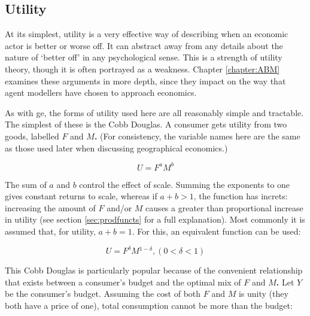 \subsection{Utility \label{sec:utilityintro}}

At its simplest, utility is a very effective way of describing when an economic actor is better or worse off. It can abstract away from any details about the nature of `better off' in any psychological sense. This is a strength of utility theory, though it is often portrayed as a weakness. Chapter \ref{chapter:ABM} examines these arguments in more depth, since they impact on the way that agent modellers have chosen to approach economics. 

As with \gls{ge}, the forms of utility used here are all reasonably simple and tractable. The simplest of these is the Cobb Douglas. A consumer gets utility from two goods, labelled $F$ and \textbf{$M$.} (For consistency, the variable names here are the same as those used later when discussing geographical economics.)

\begin{equation}
U=F^{a}M^{b}\label{eq:-1}
\end{equation}

The sum of $a$ and \textbf{$b$} control the effect of scale. Summing the exponents to one gives constant returns to scale, whereas if $a+b>1$, the function has \gls{increts}: increasing the amount of $F$ and/or $M$ causes a greater than proportional increase in utility (see section \ref{sec:prodfuncts} for a full explanation). Most commonly it is assumed that, for utility, $a+b=1$. For this, an equivalent function can be used:

\begin{equation}
U=F^{\delta}M{}^{1-\delta},(0<\delta<1)\label{eq:-3}
\end{equation}

This Cobb Douglas is particularly popular because of the convenient relationship that exists between a consumer's budget and the optimal mix of $F$ and \textbf{$M$. }Let $Y$ be the consumer's budget. Assuming the cost of both $F$ and \textbf{$M$} is unity (they both have a price of one), total consumption cannot be more than the budget:  

